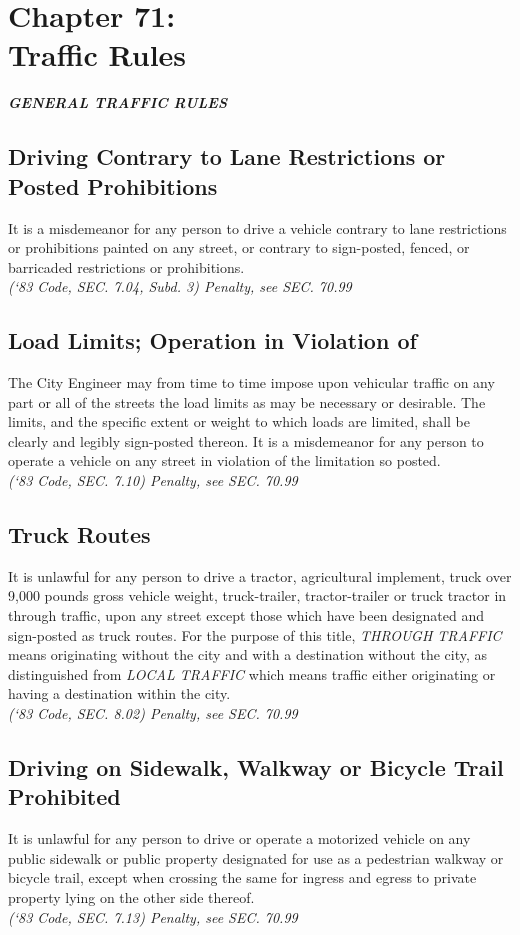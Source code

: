 \chapter*{Chapter 71: \\
	Traffic Rules}
    \minitoc
    \pagebreak


\begin{center}
\emph{\textbf{\LARGE{GENERAL TRAFFIC RULES}}}
\end{center}
\section{Driving Contrary to Lane Restrictions or Posted Prohibitions}
It is a misdemeanor for any person to drive a vehicle contrary to lane restrictions or prohibitions painted on any street, or contrary to sign-posted, fenced, or barricaded restrictions or prohibitions.\\
\emph{(‘83 Code, SEC. 7.04, Subd. 3) Penalty, see SEC. 70.99}
\section{Load Limits; Operation in Violation of}
The City Engineer may from time to time impose upon vehicular traffic on any part or all of the streets the load limits as may be necessary or desirable. The limits, and the specific extent or weight to which loads are limited, shall be clearly and legibly sign-posted thereon. It is a misdemeanor for any person to operate a vehicle on any street in violation of the limitation so posted.\\
\emph{(‘83 Code, SEC. 7.10) Penalty, see SEC. 70.99}
\section{Truck Routes}
It is unlawful for any person to drive a tractor, agricultural implement, truck over 9,000 pounds gross vehicle weight, truck-trailer, tractor-trailer or truck tractor in through traffic, upon any street except those which have been designated and sign-posted as truck routes.  For the purpose of this title, \emph{THROUGH TRAFFIC} means originating without the city and with a destination without the city, as distinguished from \emph{LOCAL TRAFFIC} which means traffic either originating or having a destination within the city.\\
\emph{(‘83 Code, SEC. 8.02) Penalty, see SEC. 70.99}
\section{Driving on Sidewalk, Walkway or Bicycle Trail Prohibited}
It is unlawful for any person to drive or operate a motorized vehicle on any public sidewalk or public property designated for use as a pedestrian walkway or bicycle trail, except when crossing the same for ingress and egress to private property lying on the other side thereof.\\
\emph{(‘83 Code, SEC. 7.13) Penalty, see SEC. 70.99}
